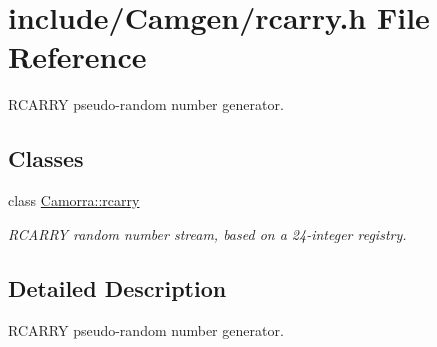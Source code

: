 \hypertarget{a00622}{
\section{include/Camgen/rcarry.h File Reference}
\label{a00622}
}


RCARRY pseudo-\/random number generator.  


\subsection*{Classes}
\begin{DoxyCompactItemize}
\item 
class \hyperlink{a00459}{Camorra::rcarry}
\begin{DoxyCompactList}\small\item\em RCARRY random number stream, based on a 24-\/integer registry. \end{DoxyCompactList}\end{DoxyCompactItemize}


\subsection{Detailed Description}
RCARRY pseudo-\/random number generator. 